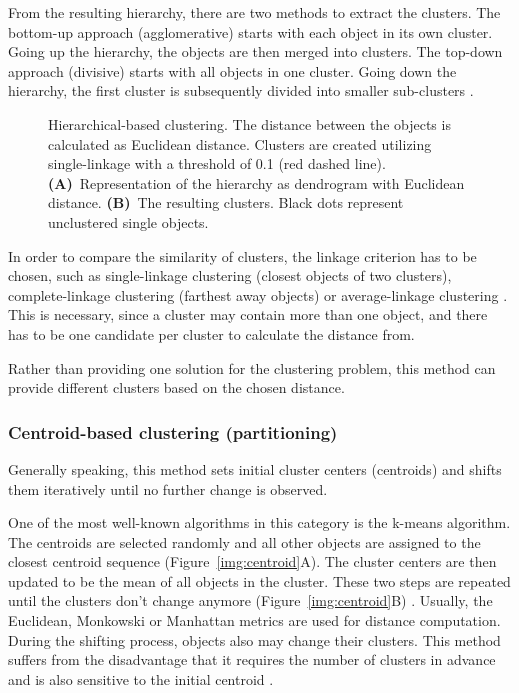 \documentclass[12pt,a4paper,english]{article}
\begin{document}
	From the resulting hierarchy, there are two methods to extract the clusters. The bottom-up approach (agglomerative) starts with each object in its own cluster. Going up the hierarchy, the objects are then merged into clusters.
	The top-down approach (divisive) starts with all objects in one cluster. Going down the hierarchy, the first cluster is subsequently divided into smaller sub-clusters \citep{hierarchical:09}.
	
	\begin{figure}[H]
		\centering
		\def\svgwidth{\textwidth}
		\vspace{-15pt}
		
		\caption[Hierarchical-based clustering.]{Hierarchical-based clustering. The distance between the objects is calculated as Euclidean distance. Clusters are created utilizing single-linkage with a threshold of 0.1 (red dashed line). \textbf{(A)}~Representation of the hierarchy as dendrogram with Euclidean distance. \textbf{(B)}~The resulting clusters. Black dots represent unclustered single objects.}
		\label{img:hierarchical}
	\end{figure}

	In order to compare the similarity of clusters, the linkage criterion has to be chosen, such as single-linkage clustering (closest objects of two clusters), complete-linkage clustering (farthest away objects) or average-linkage clustering \citep{linkage_criterion:13}. This is necessary, since a cluster may contain more than one object, and there has to be one candidate per cluster to calculate the distance from.
		
	Rather than providing one solution for the clustering problem, this method can provide different clusters based on the chosen distance.
		
\subsubsection*{Centroid-based clustering (partitioning)}
    Generally speaking, this method sets initial cluster centers (centroids) and shifts them iteratively until no further change is observed.

	One of the most well-known algorithms in this category is the k-means algorithm.
	The centroids are selected randomly and all other objects are assigned to the closest centroid sequence (Figure~\ref{img:centroid}A). The cluster centers are then updated to be the mean of all objects in the cluster. These two steps are repeated until the clusters don't change anymore (Figure~\ref{img:centroid}B) \citep{k-means:01}. Usually, the Euclidean, Monkowski or Manhattan metrics are used for distance computation. During the shifting process, objects also may change their clusters.
	This method suffers from the disadvantage that it requires the number of clusters in advance and is also sensitive to the initial centroid \citep{centroid:14}.
	
\end{document}
